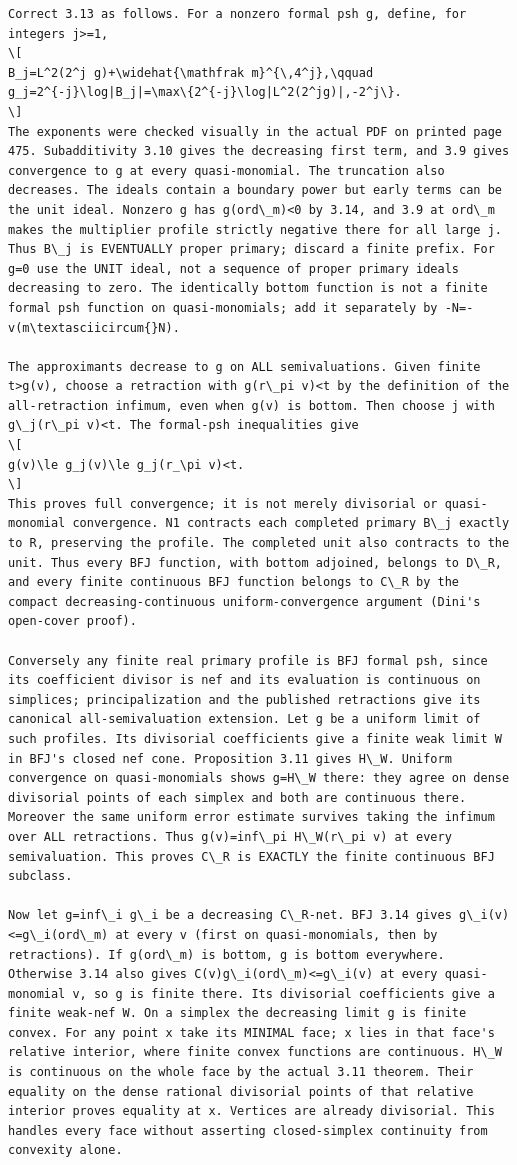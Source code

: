 \documentclass[
  11pt,
]{article}
\begin{document}
\begin{lstlisting}
Correct 3.13 as follows. For a nonzero formal psh g, define, for integers j>=1,
\[
B_j=L^2(2^j g)+\widehat{\mathfrak m}^{\,4^j},\qquad
g_j=2^{-j}\log|B_j|=\max\{2^{-j}\log|L^2(2^jg)|,-2^j\}.
\]
The exponents were checked visually in the actual PDF on printed page 475. Subadditivity 3.10 gives the decreasing first term, and 3.9 gives convergence to g at every quasi-monomial. The truncation also decreases. The ideals contain a boundary power but early terms can be the unit ideal. Nonzero g has g(ord\_m)<0 by 3.14, and 3.9 at ord\_m makes the multiplier profile strictly negative there for all large j. Thus B\_j is EVENTUALLY proper primary; discard a finite prefix. For g=0 use the UNIT ideal, not a sequence of proper primary ideals decreasing to zero. The identically bottom function is not a finite formal psh function on quasi-monomials; add it separately by -N=-v(m\textasciicircum{}N).

The approximants decrease to g on ALL semivaluations. Given finite t>g(v), choose a retraction with g(r\_pi v)<t by the definition of the all-retraction infimum, even when g(v) is bottom. Then choose j with g\_j(r\_pi v)<t. The formal-psh inequalities give
\[
g(v)\le g_j(v)\le g_j(r_\pi v)<t.
\]
This proves full convergence; it is not merely divisorial or quasi-monomial convergence. N1 contracts each completed primary B\_j exactly to R, preserving the profile. The completed unit also contracts to the unit. Thus every BFJ function, with bottom adjoined, belongs to D\_R, and every finite continuous BFJ function belongs to C\_R by the compact decreasing-continuous uniform-convergence argument (Dini's open-cover proof).

Conversely any finite real primary profile is BFJ formal psh, since its coefficient divisor is nef and its evaluation is continuous on simplices; principalization and the published retractions give its canonical all-semivaluation extension. Let g be a uniform limit of such profiles. Its divisorial coefficients give a finite weak limit W in BFJ's closed nef cone. Proposition 3.11 gives H\_W. Uniform convergence on quasi-monomials shows g=H\_W there: they agree on dense divisorial points of each simplex and both are continuous there. Moreover the same uniform error estimate survives taking the infimum over ALL retractions. Thus g(v)=inf\_pi H\_W(r\_pi v) at every semivaluation. This proves C\_R is EXACTLY the finite continuous BFJ subclass.

Now let g=inf\_i g\_i be a decreasing C\_R-net. BFJ 3.14 gives g\_i(v)<=g\_i(ord\_m) at every v (first on quasi-monomials, then by retractions). If g(ord\_m) is bottom, g is bottom everywhere. Otherwise 3.14 also gives C(v)g\_i(ord\_m)<=g\_i(v) at every quasi-monomial v, so g is finite there. Its divisorial coefficients give a finite weak-nef W. On a simplex the decreasing limit g is finite convex. For any point x take its MINIMAL face; x lies in that face's relative interior, where finite convex functions are continuous. H\_W is continuous on the whole face by the actual 3.11 theorem. Their equality on the dense rational divisorial points of that relative interior proves equality at x. Vertices are already divisorial. This handles every face without asserting closed-simplex continuity from convexity alone.


\end{lstlisting}
\end{document}
